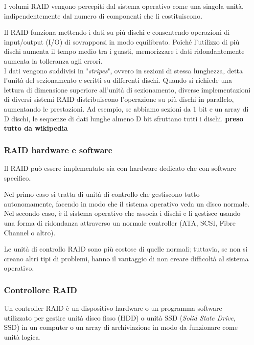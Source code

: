 I volumi RAID vengono percepiti dal sistema operativo come una singola unit\`{a}, indipendentemente dal numero di componenti che li costituiscono.

Il RAID funziona mettendo i dati su pi\`{u} dischi e consentendo operazioni di input/output (I/O) di sovrapporsi in modo equilibrato. Poich\'{e} l'utilizzo di pi\`{u} dischi aumenta il tempo medio tra i guasti, memorizzare i dati ridondantemente aumenta la tolleranza agli errori.\\

I dati vengono suddivisi in "\textit{stripes}", ovvero in sezioni di stessa  lunghezza, detta l'unit\`{a} del sezionamento e scritti su differenti dischi. Quando si richiede una lettura di dimensione superiore all'unit\`{a} di sezionamento, diverse implementazioni di diversi sistemi RAID distribuiscono l'operazione su pi\`{u} dischi in parallelo, aumentando le prestazioni. Ad esempio, se abbiamo sezioni da 1 bit e un array di D dischi, le sequenze di dati lunghe almeno D bit sfruttano tutti i dischi. \textbf{preso tutto da wikipedia}

\item
\subsubsection{RAID hardware e software}
Il RAID pu\`{o} essere implementato sia con hardware dedicato che con software specifico.

Nel primo caso si tratta di unit\`{a} di controllo che gestiscono tutto autonomamente, facendo in modo che il sistema operativo veda un disco normale. 
Nel secondo caso, \`{e} il sistema operativo che associa i dischi e li gestisce usando una forma di ridondanza attraverso un normale controller (ATA, SCSI, Fibre Channel o altro).

Le unit\`{a} di controllo RAID sono pi\`{u} costose di quelle normali; tuttavia, se non si creano altri tipi di problemi, hanno il vantaggio di non creare difficolt\`{a} al sistema operativo.

\item
\subsubsection{Controllore RAID}
Un controller RAID \`{e} un dispositivo hardware o un programma software utilizzato per gestire unit\`{a} disco fisso (HDD) o unit\`{a} SSD (\textit{Solid State Drive}, SSD) in un computer o un array di archiviazione in modo da funzionare come unit\`{a} logica.

